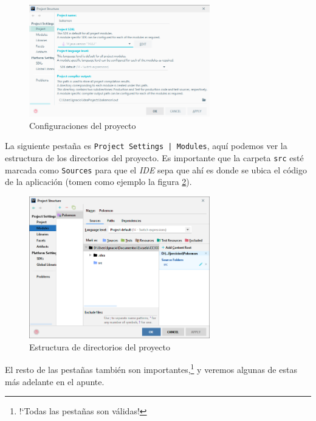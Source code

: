   \begin{figure}[ht!]
    \centering
    \includegraphics[width=0.7\textwidth]{img/Profundizando en Java/IntelliJ Project Settings.png}
    \caption{Configuraciones del proyecto}
    \label{fig:ij-project-settings}
  \end{figure}

  La siguiente pestaña es \texttt{Project Settings | Modules}, aquí podemos ver la estructura de los
  directorios del proyecto.
  Es importante que la carpeta \texttt{src} esté marcada como \texttt{Sources} para que el 
  \textit{IDE} sepa que ahí es donde se ubica el código de la aplicación (tomen como ejemplo la 
  figura \ref{fig:ij-modules}).

  \begin{figure}[ht!]
    \centering
    \includegraphics[width=0.7\textwidth]{img/Profundizando en Java/IntelliJ Project Modules.png}
    \caption{Estructura de directorios del proyecto}
    \label{fig:ij-modules}
  \end{figure}

  El resto de las pestañas también son importantes,\footnote{!`Todas las pestañas son válidas!} y 
  veremos algunas de estas más adelante en el apunte.
%